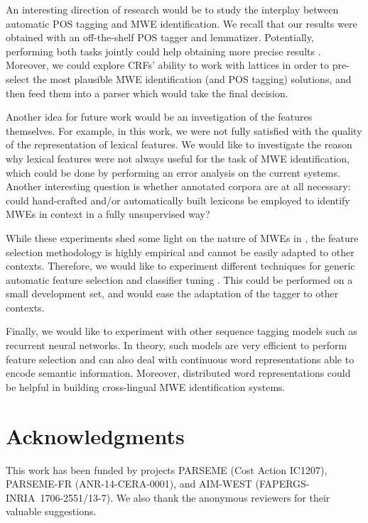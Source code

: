 \documentclass[output=paper,modfonts]{langscibook}
\begin{document}
An interesting direction of research  would be to study the interplay between automatic POS tagging and MWE identification. We recall that our results were obtained with an off-the-shelf POS tagger and lemmatizer. Potentially, performing both tasks jointly could help obtaining more precise results \citep{constant-sigogne:2011:MWE}. Moreover, we could explore CRFs' ability to work with lattices in order to pre-select the most plausible MWE identification (and POS tagging) solutions, and then feed them into a parser which would take the final decision.

Another idea for future work would be an investigation of the features themselves. For example, in this work, we were not fully satisfied with the quality of the representation of lexical features. We would like to investigate the reason why lexical features were not always useful for the task of MWE identification, which could be done by performing an error analysis on the current systems. Another interesting question is whether annotated corpora are at all necessary: could hand-crafted and/or automatically built lexicons be employed to identify MWEs in context in a fully unsupervised way?

While these experiments shed some light on the nature of MWEs in , the feature selection methodology is highly empirical and cannot be easily adapted to other contexts. Therefore, we would like to experiment different techniques for generic automatic feature selection and classifier tuning \citep{Ekbal2012}. This could be performed on a small development set, and would ease the adaptation of the tagger to other contexts.

Finally, we would like to experiment with other sequence tagging models such as recurrent neural networks. In theory, such models are very efficient to perform feature selection and can also deal with continuous word representations able to encode semantic information. Moreover, distributed word representations could be helpful in building cross-lingual MWE identification systems.
  
\section*{Acknowledgments}

This work has been funded by projects PARSEME (Cost Action IC1207), PARSEME-FR (ANR-14-CERA-0001), and AIM-WEST (FAPERGS-INRIA~1706-2551/13-7). We also thank the anonymous reviewers for their valuable suggestions.
\end{document}

